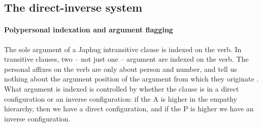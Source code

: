 \documentclass[a4paper, oneside, 12pt]{report}
\newcommand*{\citepage}[1]{p.~{#1}}
\begin{document}
\subsection{The direct-inverse system}\label{sec:grammatical.clause.direct-inverse}

\paragraph*{Polypersonal indexation and argument flagging}
The sole argument of a Japhug intransitive clause is indexed on the verb.
In transitive clauses, 
two -- not just one -- argument are indexed on the verb. 
The personal affixes on the verb are only about person and number, 
and tell us nothing about the argument position of the argument 
from which they originate \citep[\citepage{543}]{jacques2021grammar}.
What argument is indexed is controlled by whether the clause is in a direct configuration
or an inverse configuration:
if the A is higher in the empathy hierarchy,
then we have a direct configuration,
and if the P is higher we have an inverse configuration.
\end{document}
